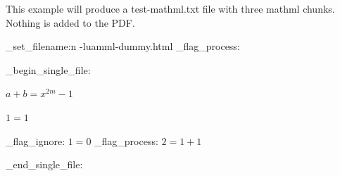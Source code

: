 \documentclass{article}
\begin{document}
This example will produce a test-mathml.txt file with three mathml chunks.
Nothing is added to the PDF.
\ExplSyntaxOn

\luamml_set_filename:n {\jobname-luamml-dummy.html}
{}
\luamml_flag_process: 

\luamml_begin_single_file:

\ExplSyntaxOff

$a+b=x^{2m} -1 $

$1=1$


\ExplSyntaxOn
\luamml_flag_ignore: 
$1=0$
\newpage
\luamml_flag_process: 
$ 2=1+1 $


\luamml_end_single_file:
\ExplSyntaxOff
\end{document}
